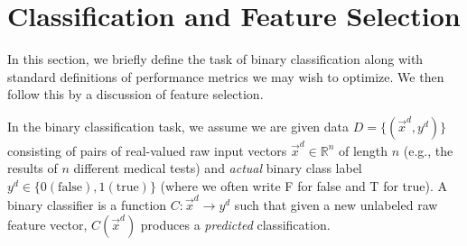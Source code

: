 \section{Classification and Feature Selection}

In this section, we briefly define the task of binary classification
along with standard definitions of performance metrics we may wish 
to optimize.  We then follow this by a discussion of feature selection.

In the binary classification task, we assume we are given data $D = \{
(\vec{x}^d, y^d) \}$ consisting of pairs of real-valued raw 
input vectors $\vec{x}^d \in \mathbb{R}^n$
of length $n$ (e.g., the results of $n$ different medical tests) and
\emph{actual} binary class label $y^d \in \{ 0 (\mathrm{ false}), 1 (\mathrm{ true}) \}$ (where
we often write F for false and T for true).
A binary classifier is a function $C: \vec{x}^d \to y^d$ such that given
a new unlabeled raw feature vector, $C(\vec{x}^d)$ produces a \emph{predicted}
classification.

